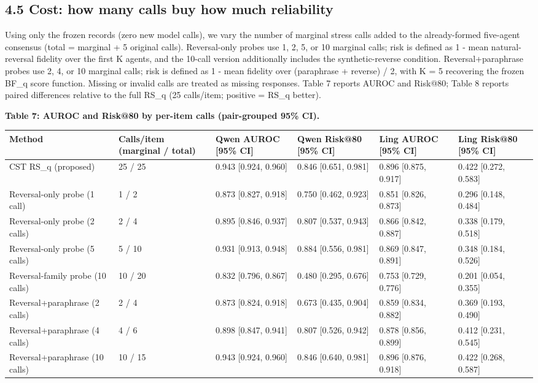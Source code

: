 \documentclass[11pt]{article}
\begin{document}
\subsection{4.5 Cost: how many calls buy how much reliability}

Using only the frozen records (zero new model calls), we vary the number of marginal stress calls added to the already-formed five-agent consensus (total = marginal + 5 original calls). Reversal-only probes use 1, 2, 5, or 10 marginal calls; risk is defined as 1 - mean natural-reversal fidelity over the first K agents, and the 10-call version additionally includes the synthetic-reverse condition. Reversal+paraphrase probes use 2, 4, or 10 marginal calls; risk is defined as 1 - mean fidelity over (paraphrase + reverse) / 2, with K = 5 recovering the frozen BF\_q score function. Missing or invalid calls are treated as missing responses. Table 7 reports AUROC and Risk@80; Table 8 reports paired differences relative to the full RS\_q (25 calls/item; positive = RS\_q better).

\textbf{Table 7: AUROC and Risk@80 by per-item calls (pair-grouped 95\% CI).}

\begin{table}[t]
\centering
\small
\begin{tabular}{llllll}
\toprule
Method & Calls/item (marginal / total) & Qwen AUROC [95\% CI] & Qwen Risk@80 [95\% CI] & Ling AUROC [95\% CI] & Ling Risk@80 [95\% CI] \\
\midrule
CST RS\_q (proposed) & 25 / 25 & 0.943 [0.924, 0.960] & 0.846 [0.651, 0.981] & 0.896 [0.875, 0.917] & 0.422 [0.272, 0.583] \\
Reversal-only probe (1 call) & 1 / 2 & 0.873 [0.827, 0.918] & 0.750 [0.462, 0.923] & 0.851 [0.826, 0.873] & 0.296 [0.148, 0.484] \\
Reversal-only probe (2 calls) & 2 / 4 & 0.895 [0.846, 0.937] & 0.807 [0.537, 0.943] & 0.866 [0.842, 0.887] & 0.338 [0.179, 0.518] \\
Reversal-only probe (5 calls) & 5 / 10 & 0.931 [0.913, 0.948] & 0.884 [0.556, 0.981] & 0.869 [0.847, 0.891] & 0.348 [0.184, 0.526] \\
Reversal-family probe (10 calls) & 10 / 20 & 0.832 [0.796, 0.867] & 0.480 [0.295, 0.676] & 0.753 [0.729, 0.776] & 0.201 [0.054, 0.355] \\
Reversal+paraphrase (2 calls) & 2 / 4 & 0.873 [0.824, 0.918] & 0.673 [0.435, 0.904] & 0.859 [0.834, 0.882] & 0.369 [0.193, 0.490] \\
Reversal+paraphrase (4 calls) & 4 / 6 & 0.898 [0.847, 0.941] & 0.807 [0.526, 0.942] & 0.878 [0.856, 0.899] & 0.412 [0.231, 0.545] \\
Reversal+paraphrase (10 calls) & 10 / 15 & 0.943 [0.924, 0.960] & 0.846 [0.640, 0.981] & 0.896 [0.876, 0.918] & 0.422 [0.268, 0.587] \\
\bottomrule
\end{tabular}
\end{table}
\end{document}

